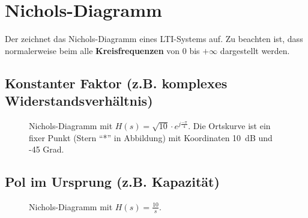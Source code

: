 {\section{Nichols-Diagramm}
Der  zeichnet das Nichols-Diagramm eines LTI-Systems auf. Zu beachten ist, dass normalerweise beim  alle {\bf
  Kreisfrequenzen} von 0 bis
$+\infty$ dargestellt werden.
\vspace*{-3mm}
\subsection{Konstanter Faktor (z.B. komplexes Widerstandsverh\"altnis)}
\vspace*{-3mm}
\begin{figure}[!htb]%
\vspace*{-8mm}
\begin{center}
  \vspace*{-3mm}\caption{Nichols-Diagramm  mit $H(s)=\sqrt{10}\cdot e^{j\frac{-\pi}{4}}$. Die Ortskurve ist ein fixer Punkt (Stern ``*'' in Abbildung) mit Koordinaten 10~dB und -45 Grad.}
\end{center}
\vspace*{-6mm}
\end{figure}


\newpage

\vspace*{-5mm}\subsection{Pol im Ursprung (z.B. Kapazit\"at)}
\vspace*{-5mm}
\begin{figure}[!htb]%
\vspace*{-3mm}
\begin{center}
  \vspace*{-3mm}\caption{Nichols-Diagramm  mit $H(s)=\frac{10}{s}$.}
\end{center}
\vspace*{-6mm}
\end{figure}


}
